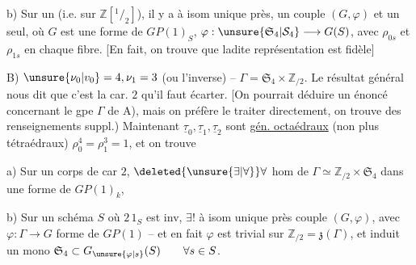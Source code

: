 b) Sur un  (i.e. sur $\mathbb Z[{}^1\!/_2]$), il
y a à isom unique près, un couple $(G,\varphi)$
et un seul, où $G$ est une forme de $GP(1)_S$,
$\varphi:\unsure{\mathfrak S_4|\mathcal S_4}\longrightarrow G(S)$, avec $\rho_{0s}$ et $\rho_{1s}$ 
en chaque fibre.  [En fait,  on trouve que
ladite représentation   est fidèle]

B) $\unsure{\nu_0|v_0}=4,\nu_1=3$ (ou l'inverse) -- 
$\Gamma=\mathfrak S_4\times\mathbb Z_{/2}$. Le résultat général nous dit que
c'est  la car. $2$ qu'il faut écarter. [On pourrait
déduire un énoncé concernant le gpe $\Gamma$ de
A), mais on préfère le traiter directement, on
trouve des renseignements suppl.) Maintenant $\underline{\tau}_0,\underline{\tau}_1,\underline{\tau}_2$
sont  \uline{gén. octaédraux} (non plus
tétraédraux)  $\rho_0^4=\rho_1^3=1$, et on
trouve

a) Sur un corps de car $2$, $\deleted{\unsure{\exists|\forall}}\forall$ hom  de
$\Gamma\simeq\mathbb Z_{/2}\times\mathfrak S_4$ dans une forme de $GP(1)_k$,

b) Sur un schéma $S$ où $2\,1_S$ est inv,
$\exists!$ à isom unique près couple $(G,\varphi)$, avec
$\varphi:\Gamma\longrightarrow G$ forme de $GP(1)$  -- et en fait
$\varphi$ est trivial sur $\mathbb Z_{/2}=\mathfrak z(\Gamma)$, et induit un
mono $\mathfrak S_4\subset G_{\unsure{\varphi|s}}(S)\qquad\forall s\in S$.
